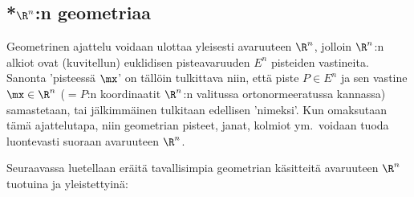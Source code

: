 \subsection{*$\R^n$:n geometriaa}

Geometrinen ajattelu voidaan ulottaa yleisesti avaruuteen $\R^n$, jolloin $\R^n$:n alkiot ovat
(kuvitellun) euklidisen pisteavaruuden $E^n$ pisteiden vastineita. Sanonta 'pisteessä $\mx$' on
tällöin tulkittava niin, että piste $P \in E^n$ ja sen vastine $\mx \in \R^n$ 
($=P$:n koordinaatit $\R^n$:n valitussa ortonormeeratussa kannassa) samastetaan, tai
jälkimmäinen tulkitaan edellisen 'nimeksi'. Kun omaksutaan tämä ajattelutapa, niin geometrian
pisteet, janat, kolmiot ym.\ voidaan tuoda luontevasti suoraan avaruuteen $\R^n$.

Seuraavassa luetellaan eräitä tavallisimpia geometrian käsitteitä avaruuteen $\R^n$ tuotuina ja
yleistettyinä:
